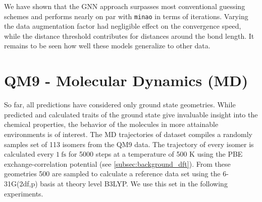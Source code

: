 We have shown that the GNN approach surpasses most conventional guessing schemes and performs nearly on par with \texttt{minao} in terms of iterations. Varying the data augmentation factor had negligible effect on the convergence speed, while the distance threshold contributes for distances around the bond length. It remains to be seen how well these models generalize to other data. 

\section{QM9 -  Molecular Dynamics (MD)}
\label{sec:qm9_md_isomers_benchmark}
So far, all predictions have considered only ground state geometries. While predicted and calculated traits of the ground state give invaluable insight into the chemical properties, the behavior of the molecules in more attainable environments is of interest. The MD trajectories of  dataset \parencite{ref:qm9_isomers_md} compiles a randomly samples set of 113 isomers from the QM9  data. The trajectory of every isomer is calculated every $\SI{1}{\femto\second}$ for 5000 steps at a temperature of 500 K using the PBE exchange-correlation potential (see \ref{subsec:background_dft}). From these geometries 500 are sampled to calculate a reference data set using the 6-31G(2df,p) basis at theory level B3LYP. We use this set in the following experiments. 

